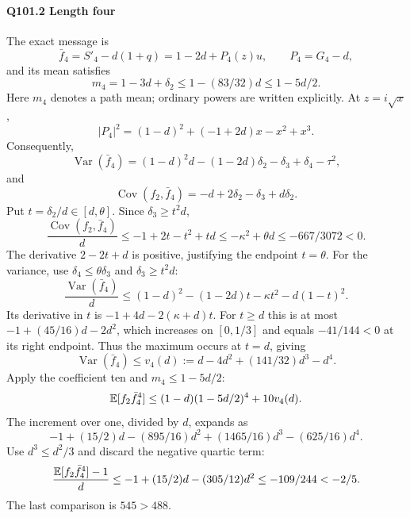 \paragraph{Q101.2 Length four}\label{part:Q101.2}
The exact message is
\[
 \bar f_4=S'_4-d(1+q)=1-2d+P_4(z)u,\qquad P_4=G_4-d,
\]
and its mean satisfies
\[
 m_4=1-3d+\delta_2\le1-(83/32)d\le1-5d/2.
\]
Here $m_4$ denotes a path mean; ordinary powers are written explicitly.
At $z=\allowbreak i\sqrt x$,
\[
 |P_4|^2=(1-d)^2+(-1+2d)x-x^2+x^3.
\]
Consequently,
\[
 \operatorname{Var}(\bar f_4)
 =(1-d)^2d-(1-2d)\delta_2-\delta_3+\delta_4-\tau^2,
\]
and
\[
 \operatorname{Cov}(f_2,\bar f_4)=-d+2\delta_2-\delta_3+d\delta_2.
\]
Put $t=\allowbreak \delta_2/d\in[d,\allowbreak \theta]$. Since $\delta_3\ge\allowbreak  t^2d$,
\[
 \frac{\operatorname{Cov}(f_2,\bar f_4)}d
 \le-1+2t-t^2+td\le-\kappa^2+\theta d
 \le-667/3072<0.
\]
The derivative $2-2t+d$ is positive, justifying the endpoint $t=\allowbreak \theta$.
For the variance, use $\delta_4\le\allowbreak \theta\delta_3$ and
$\delta_3\ge\allowbreak  t^2d$:
\[
 \frac{\operatorname{Var}(\bar f_4)}d
 \le(1-d)^2-(1-2d)t-\kappa t^2-d(1-t)^2.
\]
Its derivative in $t$ is $-1+4d-2(\kappa+d)t$.
For $t\ge\allowbreak  d$ this is at most $-1+(45/16)d-2d^2$, which increases
on $[0,\allowbreak 1/3]$ and equals $-41/144<\allowbreak 0$ at its right endpoint.
Thus the maximum occurs at $t=\allowbreak d$, giving
\[
 \operatorname{Var}(\bar f_4)\le
 v_4(d):=d-4d^2+(141/32)d^3-d^4.
\]
Apply the coefficient ten and $m_4\le\allowbreak 1-5d/2$:
\[
 \mathbb E[f_2\bar f_4^4]\le(1-d)(1-5d/2)^4+10v_4(d).
\]
The increment over one, divided by $d$, expands as
\[
 -1+(15/2)d-(895/16)d^2+(1465/16)d^3-(625/16)d^4.
\]
Use $d^3\le\allowbreak  d^2/3$ and discard the negative quartic term:
\[
 \frac{\mathbb E[f_2\bar f_4^4]-1}d
 \le-1+(15/2)d-(305/12)d^2\le-109/244<-2/5.
\]
The last comparison is $545>\allowbreak 488$.

